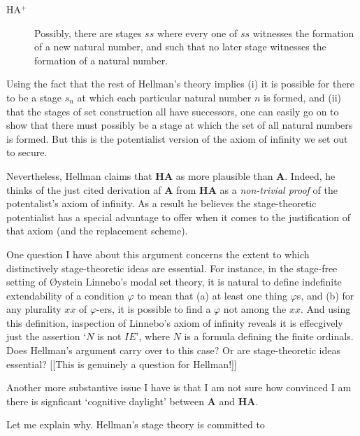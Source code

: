\documentclass{amsart}
\theoremstyle{definition}
\begin{document}
\begin{description}
    \item[HA$^+$] Possibly, there are stages $ss$ 
    where every one of $ss$ witnesses the formation of a new natural number, 
    and such that no later stage witnesses the formation of a natural number.
\end{description}

Using the fact that the rest of Hellman's theory implies (i)
it is possible for there to be a stage $s_n$ at which 
each particular natural number $n$ is formed, and (ii) that the 
stages of set construction all have successors,
one can easily go on to show that there must possibly be a stage 
at which the set of all natural numbers is formed.
But this is the potentialist version of the axiom of infinity we 
set out to secure.

Nevertheless, Hellman claims that {\bf HA} as more plausible than {\bf A}.
Indeed, he thinks of the just cited derivation af {\bf A} from {\bf HA}
as a \emph{non-trivial proof} of the potentalist's axiom of infinity. 
As a result he believes the stage-theoretic potentialist has a 
special advantage to offer when it comes to 
the justification of that axiom (and the replacement scheme).

One question I have about this argument concerns the 
extent to which distinctively stage-theoretic ideas are essential.
For instance, in the stage-free setting of \O ystein Linnebo's modal 
set theory, it is natural to define indefinite extendability of a condition 
$\varphi$ to mean that (a) at least one thing $\varphi$s, and (b) for any 
plurality $xx$ of $\varphi$-ers, it is possible to find a $\varphi$ not among 
the $xx$. And using this definition, inspection of Linnebo's axiom of infinity 
reveals it is effecgively just the assertion `$N$ is not $IE$', where $N$ is a
formula defining the finite ordinals. Does Hellman's argument carry over to
this case? Or are stage-theoretic ideas essential? [[This is genuinely 
a question for Hellman!]]

Another more substantive issue I have is that I am not sure how 
convinced I am there is signficant `cognitive daylight' between 
{\bf A} and {\bf HA}.

Let me explain why. Hellman's stage theory is committed to 
\end{document}
